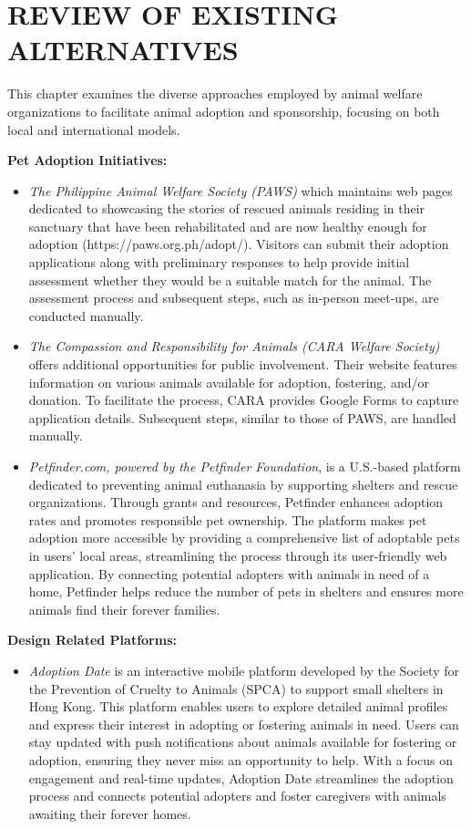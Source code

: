 \section{REVIEW OF EXISTING ALTERNATIVES}
This chapter examines the diverse approaches employed by animal welfare organizations to facilitate animal adoption and sponsorship, focusing on both local and international models. 


\textbf{Pet Adoption Initiatives:}

\begin{itemize}
 \item \textit{The Philippine Animal Welfare Society (PAWS)} which maintains web pages dedicated to showcasing the stories of rescued animals residing in their sanctuary that have been rehabilitated and are now healthy enough for adoption (https://paws.org.ph/adopt/). Visitors can submit their adoption applications along with preliminary responses to help provide initial assessment whether they would be a suitable match for the animal. The assessment process and subsequent steps, such as in-person meet-ups, are conducted manually.

  \item \textit{The Compassion and Responsibility for Animals (CARA Welfare Society)} offers additional opportunities for public involvement. Their website features information on various animals available for adoption, fostering, and/or donation. To facilitate the process, CARA provides Google Forms to capture application details. Subsequent steps, similar to those of PAWS, are handled manually.

  \item \textit{Petfinder.com, powered by the Petfinder Foundation}, is a U.S.-based platform dedicated to preventing animal euthanasia by supporting shelters and rescue organizations. Through grants and resources, Petfinder enhances adoption rates and promotes responsible pet ownership. The platform makes pet adoption more accessible by providing a comprehensive list of adoptable pets in users' local areas, streamlining the process through its user-friendly web application. By connecting potential adopters with animals in need of a home, Petfinder helps reduce the number of pets in shelters and ensures more animals find their forever families.
 \end{itemize}


\textbf{Design Related Platforms:}

\begin{itemize}
 \item \textit{Adoption Date }is an interactive mobile platform developed by the Society for the Prevention of Cruelty to Animals (SPCA) to support small shelters in Hong Kong. This platform enables users to explore detailed animal profiles and express their interest in adopting or fostering animals in need. Users can stay updated with push notifications about animals available for fostering or adoption, ensuring they never miss an opportunity to help. With a focus on engagement and real-time updates, Adoption Date streamlines the adoption process and connects potential adopters and foster caregivers with animals awaiting their forever homes.
 \end{itemize}

                
